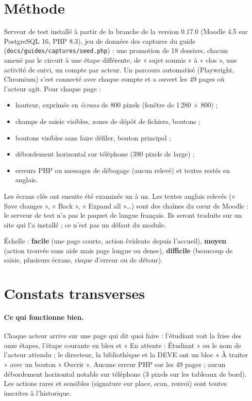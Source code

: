 \documentclass[11pt,a4paper]{article}
\newcommand{\code}[1]{\texttt{#1}}
\newcommand{\facile}{\textcolor{green!45!black}{\textbf{facile}}}
\newcommand{\moyen}{\textcolor{orange!80!black}{\textbf{moyen}}}
\newcommand{\difficile}{\textcolor{red!70!black}{\textbf{difficile}}}
\begin{document}
\section{Méthode}

Serveur de test installé à partir de la branche de la version 0.17.0 (Moodle 4.5 sur
PostgreSQL 16, PHP 8.3), jeu de données des captures du guide
(\code{docs/guides/captures/seed.php}) : une promotion de 18 dossiers, chacun amené par le circuit
à une étape différente, de « sujet soumis » à « clos », une activité de suivi, un compte par
acteur. Un parcours automatisé (Playwright, Chromium) s'est connecté avec chaque compte et a ouvert
les 49 pages où l'acteur agit. Pour chaque page :

\begin{itemize}
  \item hauteur, exprimée en \emph{écrans} de 800 pixels (fenêtre de 1\,280 × 800) ;
  \item champs de saisie visibles, zones de dépôt de fichiers, boutons ;
  \item boutons visibles sans faire défiler, bouton principal ;
  \item débordement horizontal sur téléphone (390 pixels de large) ;
  \item erreurs PHP ou messages de débogage (aucun relevé) et textes restés en anglais.
\end{itemize}

Les écrans clés ont ensuite été examinés un à un. Les textes anglais relevés (« Save changes »,
« Back », « Expand all »\ldots) sont des chaînes du cœur de Moodle : le serveur de test n'a pas le
paquet de langue français. Ils seront traduits sur un site qui l'a installé ; ce n'est pas un
défaut du module.

Échelle : \facile{} (une page courte, action évidente depuis l'accueil), \moyen{} (action
trouvée sans aide mais page longue ou dense), \difficile{} (beaucoup de saisie, plusieurs
écrans, risque d'erreur ou de détour).

\section{Constats transverses}\label{sec:transverse}

\paragraph{Ce qui fonctionne bien.} Chaque acteur arrive sur une page qui dit quoi faire :
l'étudiant voit la frise des onze étapes, l'étape courante en bleu et « En attente : Étudiant »
ou le nom de l'acteur attendu ; le directeur, la bibliothèque et la DEVE ont un bloc « À traiter »
avec un bouton « Ouvrir ». Aucune erreur PHP sur les 49 pages ; aucun débordement horizontal
notable sur téléphone (3 pixels sur les tableaux de bord). Les actions rares et sensibles
(signature sur place, scan, renvoi) sont toutes inscrites à l'historique.
\end{document}
